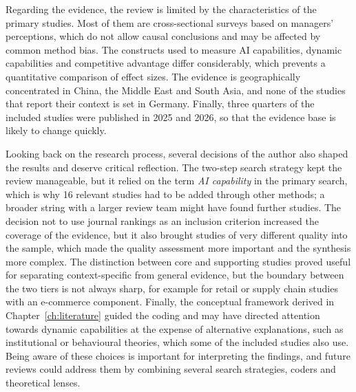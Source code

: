 Regarding the evidence, the review is limited by the characteristics of the primary studies. Most of them are cross-sectional surveys based on managers' perceptions, which do not allow causal conclusions and may be affected by common method bias. The constructs used to measure AI capabilities, dynamic capabilities and competitive advantage differ considerably, which prevents a quantitative comparison of effect sizes. The evidence is geographically concentrated in China, the Middle East and South Asia, and none of the studies that report their context is set in Germany. Finally, three quarters of the included studies were published in 2025 and 2026, so that the evidence base is likely to change quickly.

Looking back on the research process, several decisions of the author also shaped the results and deserve critical reflection. The two-step search strategy kept the review manageable, but it relied on the term \emph{AI capability} in the primary search, which is why 16 relevant studies had to be added through other methods; a broader string with a larger review team might have found further studies. The decision not to use journal rankings as an inclusion criterion increased the coverage of the evidence, but it also brought studies of very different quality into the sample, which made the quality assessment more important and the synthesis more complex. The distinction between core and supporting studies proved useful for separating context-specific from general evidence, but the boundary between the two tiers is not always sharp, for example for retail or supply chain studies with an e-commerce component. Finally, the conceptual framework derived in Chapter~\ref{ch:literature} guided the coding and may have directed attention towards dynamic capabilities at the expense of alternative explanations, such as institutional or behavioural theories, which some of the included studies also use. Being aware of these choices is important for interpreting the findings, and future reviews could address them by combining several search strategies, coders and theoretical lenses.

